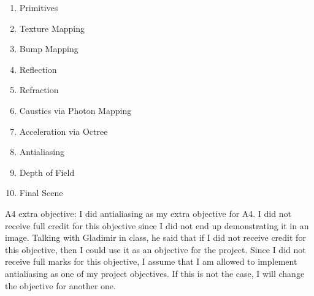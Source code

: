 \documentclass {article}
\begin{document}
\begin{enumerate}
     \item Primitives
     \item Texture Mapping
     \item Bump Mapping
     \item Reflection
     \item Refraction
     \item Caustics via Photon Mapping
     \item Acceleration via Octree
     \item Antialiasing
     \item Depth of Field
     \item Final Scene
\end{enumerate}


A4 extra objective: I did antialiasing as my extra objective for A4. I did not receive full credit for this objective since I did not end up demonstrating it in an image. Talking with Gladimir in class, he said that if I did not receive credit for this objective, then I could use it as an objective for the project. Since I did not receive full marks for this objective, I assume that I am allowed to implement antialiasing as one of my project objectives. If this is not the case, I will change the objective for another one.
\end{document}
